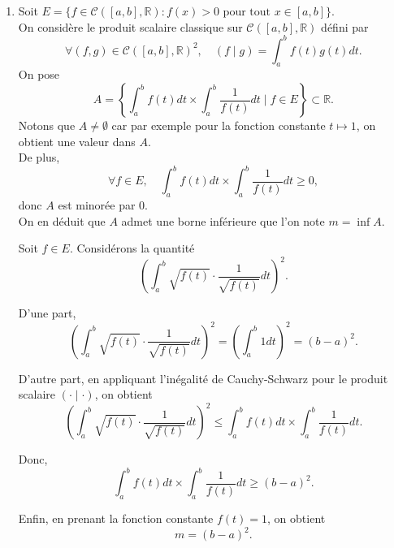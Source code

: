 \documentclass[a4paper,12pt,oneside]{book}
\newenvironment{solution}{\begin{solutionbox}}{\end{solutionbox}}
\begin{document}
\begin{solution}
\begin{enumerate}
			\item Soit \( E = \{ f \in \mathcal{C}([a,b], \mathbb{R}) : f(x) > 0 \text{ pour tout } x \in [a,b] \} \).\\
			On considère le produit scalaire classique sur \(\mathcal{C}([a,b], \mathbb{R})\) défini par
			\[
			\forall (f,g) \in \mathcal{C}([a,b], \mathbb{R})^2, \quad (f \mid g) = \int_a^b f(t) g(t) dt.
			\]
			On pose
			\[
			A = \left\{ \int_a^b f(t) dt \times \int_a^b \frac{1}{f(t)} dt \mid f \in E \right\} \subset \mathbb{R}.
			\]
			Notons que \(A \neq \emptyset\) car par exemple pour la fonction constante \(t \mapsto 1\), on obtient une valeur dans \(A\).\\
			De plus,
			\[
			\forall f \in E, \quad \int_a^b f(t) dt \times \int_a^b \frac{1}{f(t)} dt \geq 0,
			\]
			donc \(A\) est minorée par 0.\\
			On en déduit que \(A\) admet une borne inférieure que l'on note \(m = \inf A\).
			
			Soit \( f \in E \). Considérons la quantité
			\[
			\left( \int_a^b \sqrt{f(t)} \cdot \frac{1}{\sqrt{f(t)}} dt \right)^2.
			\]
			
			D’une part,
			\[
			\left( \int_a^b \sqrt{f(t)} \cdot \frac{1}{\sqrt{f(t)}} dt \right)^2 = \left( \int_a^b 1 dt \right)^2 = (b - a)^2.
			\]
			
			D’autre part, en appliquant l’inégalité de Cauchy-Schwarz pour le produit scalaire \(( \cdot \mid \cdot )\), on obtient
			\[
			\left( \int_a^b \sqrt{f(t)} \cdot \frac{1}{\sqrt{f(t)}} dt \right)^2 \leq \int_a^b f(t) dt \times \int_a^b \frac{1}{f(t)} dt.
			\]
			
			Donc,
			\[
			\int_a^b f(t) dt \times \int_a^b \frac{1}{f(t)} dt \geq (b - a)^2.
			\]
			
			Enfin, en prenant la fonction constante \(f(t) = 1\), on obtient
			\[
			m = (b - a)^2.
			\]
		\end{enumerate}
	\end{solution}
	
	
	\backmatter
	
\end{document}
